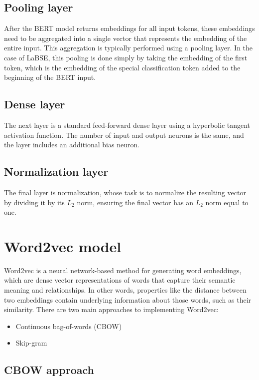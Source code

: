 \subsection{Pooling layer}

After the BERT model returns embeddings for all input tokens, these embeddings need to be aggregated into a single vector that represents the embedding of the entire input. This aggregation is typically performed using a pooling layer. In the case of LaBSE, this pooling is done simply by taking the embedding of the first token, which is the embedding of the special classification token added to the beginning of the BERT input.

\subsection{Dense layer}

The next layer is a standard feed-forward dense layer using a hyperbolic tangent activation function. The number of input and output neurons is the same, and the layer includes an additional bias neuron.

\subsection{Normalization layer}

The final layer is normalization, whose task is to normalize the resulting vector by dividing it by its $L_2$ norm, ensuring the final vector has an $L_2$ norm equal to one.

\section{Word2vec model}
\label{theoryW2v}

Word2vec is a neural network-based method for generating word embeddings, which are dense vector representations of words that capture their semantic meaning and relationships. In other words, properties like the distance between two embeddings contain underlying information about those words, such as their similarity. There are two main approaches to implementing Word2vec:

\begin{itemize}
	\item Continuous bag-of-words (CBOW) 
	\item Skip-gram
\end{itemize}

\subsection{CBOW approach}

